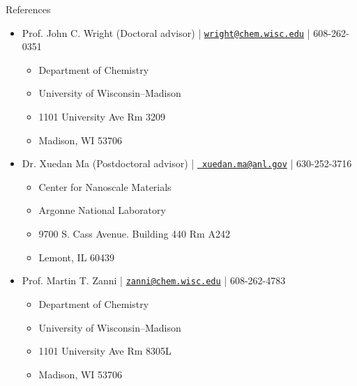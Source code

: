 \documentclass{resume} %
\begin{document}
\pagebreak

\begin{rSection}{References}
	\begin{itemize}[leftmargin = 0 pt]
		\item Prof. John C. Wright (Doctoral advisor) | \href{mailto:wright@chem.wisc.edu}{\texttt{wright@chem.wisc.edu}} | 608-262-0351
		\begin{itemize}
			\item[] Department of Chemistry
			\item[] University of Wisconsin--Madison
			\item[] 1101 University Ave Rm 3209
			\item[] Madison, WI 53706
		\end{itemize}
		\item Dr. Xuedan Ma (Postdoctoral advisor) | \href{mailto: xuedan.ma@anl.gov}{\texttt{ xuedan.ma@anl.gov}} | 630-252-3716
		\begin{itemize}
			\item[] Center for Nanoscale Materials
			\item[] Argonne National Laboratory
			\item[] 9700 S. Cass Avenue. Building 440 Rm A242
			\item[] Lemont, IL 60439
		\end{itemize}	
		\item Prof. Martin T. Zanni | \href{mailto:zanni@chem.wisc.edu}{\texttt{zanni@chem.wisc.edu}} | 608-262-4783
		\begin{itemize}
			\item[] Department of Chemistry
			\item[] University of Wisconsin--Madison
			\item[] 1101 University Ave Rm 8305L
			\item[] Madison, WI 53706
		\end{itemize}
		

\end{itemize}
\end{rSection}
\end{document}
